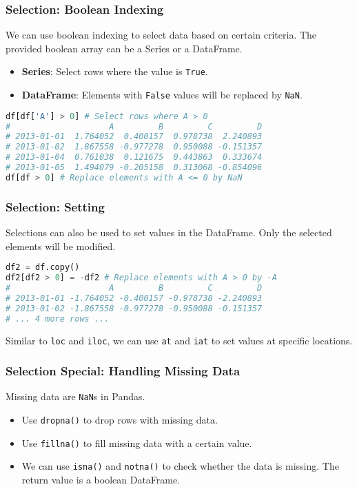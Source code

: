 \documentclass[beamer, en, version=2.0]{huangfusl-template}
\begin{document}
    \begin{frame}[fragile]
        \frametitle{Selection: Boolean Indexing}

        We can use boolean indexing to select data based on certain criteria. The provided boolean array can be a Series or a DataFrame.

        \begin{itemize}
            \item \textbf{Series}: Select rows where the value is {\footnotesize\verb|True|}.
            \item \textbf{DataFrame}: Elements with {\footnotesize\verb|False|} values will be replaced by {\footnotesize\verb|NaN|}.
        \end{itemize}

\begin{lstlisting}[language=python]
df[df['A'] > 0] # Select rows where A > 0
#                    A         B         C         D
# 2013-01-01  1.764052  0.400157  0.978738  2.240893
# 2013-01-02  1.867558 -0.977278  0.950088 -0.151357
# 2013-01-04  0.761038  0.121675  0.443863  0.333674
# 2013-01-05  1.494079 -0.205158  0.313068 -0.854096
df[df > 0] # Replace elements with A <= 0 by NaN
\end{lstlisting}
    \end{frame}
    \begin{frame}[fragile]
        \frametitle{Selection: Setting}

        Selections can also be used to set values in the DataFrame. Only the selected elements will be modified.

\begin{lstlisting}[language=python]
df2 = df.copy()
df2[df2 > 0] = -df2 # Replace elements with A > 0 by -A
#                    A         B         C         D
# 2013-01-01 -1.764052 -0.400157 -0.978738 -2.240893
# 2013-01-02 -1.867558 -0.977278 -0.950088 -0.151357
# ... 4 more rows ...
\end{lstlisting}

        Similar to {\color{blue}\footnotesize\verb|loc|} and {\color{blue}\footnotesize\verb|iloc|}, we can use {\color{blue}\footnotesize\verb|at|} and {\color{blue}\footnotesize\verb|iat|} to set values at specific locations.
    \end{frame}
    \begin{frame}[fragile]
        \frametitle{Selection Special: Handling Missing Data}

        Missing data are {\footnotesize\verb|NaN|}s in Pandas.

        \begin{itemize}
            \item Use {\color{blue}\footnotesize\verb|dropna()|} to drop rows with missing data.
            \item Use {\color{blue}\footnotesize\verb|fillna()|} to fill missing data with a certain value.
            \item We can use {\color{blue}\footnotesize\verb|isna()|} and {\color{blue}\footnotesize\verb|notna()|} to check whether the data is missing. The return value is a boolean DataFrame.
        \end{itemize}
    \end{frame}
\end{document}

